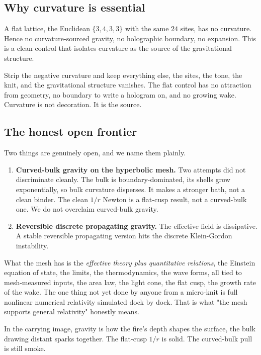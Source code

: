 \subsection{Why curvature is essential}

A flat lattice, the Euclidean $\{3,4,3,3\}$ with the same $24$ sites, has no curvature. Hence no curvature-sourced gravity, no holographic boundary, no expansion. This is a clean control that isolates curvature as the source of the gravitational structure.

\begin{principle}
Strip the negative curvature and keep everything else, the sites, the tone, the knit, and the gravitational structure vanishes. The flat control has no attraction from geometry, no boundary to write a hologram on, and no growing wake. Curvature is not decoration. It is the source.
\end{principle}

\subsection{The honest open frontier}

Two things are genuinely open, and we name them plainly.

\begin{enumerate}
\item \textbf{Curved-bulk gravity on the hyperbolic mesh.} Two attempts did not discriminate cleanly. The bulk is boundary-dominated, its shells grow exponentially, so bulk curvature disperses. It makes a stronger bath, not a clean binder. The clean $1/r$ Newton is a flat-cusp result, not a curved-bulk one. We do not overclaim curved-bulk gravity.
\item \textbf{Reversible discrete propagating gravity.} The effective field is dissipative. A stable reversible propagating version hits the discrete Klein-Gordon instability.
\end{enumerate}

What the mesh has is the \emph{effective theory plus quantitative relations}, the Einstein equation of state, the limits, the thermodynamics, the wave forms, all tied to mesh-measured inputs, the area law, the light cone, the flat cusp, the growth rate of the wake. The one thing not yet done by anyone from a micro-knit is full nonlinear numerical relativity simulated dock by dock. That is what "the mesh supports general relativity" honestly means.

\begin{principle}
In the carrying image, gravity is how the fire's depth shapes the surface, the bulk drawing distant sparks together. The flat-cusp $1/r$ is solid. The curved-bulk pull is still smoke.
\end{principle}
